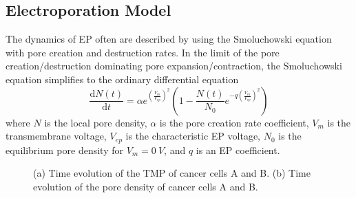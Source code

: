 \documentclass[conference]{IEEEtran}
\begin{document}
\subsection{Electroporation Model}
 The dynamics of EP often are described by using the Smoluchowski equation with pore creation and destruction rates. In the limit of the pore creation/destruction dominating pore expansion/contraction\cite{powell1986transient}, the Smoluchowski equation simplifies to the ordinary differential equation
\begin{equation}
	\frac{\mathrm{d}N(t)}{\mathrm{d}t} = \alpha e^{\left ( \frac{V_m}{V_{ep}}  \right )^{2}  } \left ( 1-\frac{N(t)}{N_0}e^{-q\left (\frac{V_m}{V_{ep}}   \right )^{2}  }  \right )
\end{equation}
where $N$ is the local pore density, $\alpha$ is the pore creation rate coefficient, $V_m$ is the transmembrane voltage, $V_{ep}$ is the characteristic EP voltage, $N_0$ is the equilibrium pore density for $V_m = 0~V$, and $q$ is an EP coefficient.
\begin{figure}[htbp]
	\centering
	
	\caption{(a) Time evolution of the TMP of cancer cells A and B. (b) Time evolution of the pore density of cancer cells A and B.}
	\label{fig::3}
\end{figure}
\end{document}
